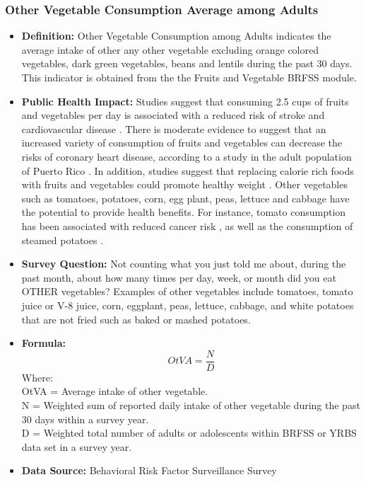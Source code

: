 \documentclass[12pt,letterpaper]{report}
\begin{document}
		\subsubsection{Other Vegetable Consumption Average among Adults} 
	\begin{itemize}
		\item \textbf{Definition:} Other Vegetable Consumption among Adults indicates the average intake of other any other vegetable excluding orange colored vegetables, dark green vegetables, beans and lentils during the past 30 days. This indicator is obtained from the the Fruits and Vegetable BRFSS module. 
		\item \textbf{Public Health Impact:} Studies suggest that consuming 2.5 cups of fruits and vegetables per day is associated with a reduced risk of stroke \cite{he2006fruit} and cardiovascular disease \cite{bazzano2002fruit}. There is moderate evidence to suggest that an increased variety of consumption of fruits and vegetables can decrease the risks of coronary heart disease, according to a study in the adult population of Puerto Rico \cite{bhupathiraju2011greater}. In addition, studies suggest that replacing calorie rich foods with fruits and vegetables could promote healthy weight \cite{rolls2004can}. Other vegetables such as tomatoes, potatoes, corn, egg plant, peas, lettuce and cabbage have the potential to provide health benefits. For instance, tomato consumption has been associated with reduced cancer risk \cite{giovannucci1999tomatoes}, as well as the consumption of steamed potatoes \cite{tudela2002induction}.

		\item \textbf{Survey Question:} Not counting what you just told me about, during the past month, about how many times per day, week, or month did you eat OTHER vegetables? Examples of other vegetables include tomatoes, tomato juice or V-8 juice, corn, eggplant, peas, lettuce, cabbage, and white potatoes that are not fried such as baked or mashed potatoes.
		\item \textbf{Formula:} 
			\begin{equation}
				OtVA = \frac{N}{D}
			\end{equation}
Where: \\
			OtVA = Average intake of other vegetable.\\
			
			N = Weighted sum of reported daily intake of other vegetable during the past 30 days within a survey year.\\
			
			D = Weighted total number of adults or adolescents within BRFSS or YRBS data set in a survey year.\\
			
		\item \textbf{Data Source:} Behavioral Risk Factor Surveillance Survey
	\end{itemize}
\end{document}
